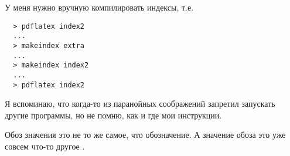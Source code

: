 \documentclass[twoside]{book}
\begin{document}
У меня нужно вручную компилировать индексы, т.е.
\begin{verbatim}
  > pdflatex index2
  ...
  > makeindex extra
  ...
  > makeindex index2
  ...
  > pdflatex index2
\end{verbatim}
Я вспоминаю, что когда-то из паранойных соображений запретил 
запускать другие программы, но не помню, как и где мои инструкции.
    
Обоз значения это не то же самое, что обозначение.
А значение обоза это уже совсем что-то другое%
.

\newpage
\printindex
\newpage
\printindex[extra]
\end{document}
